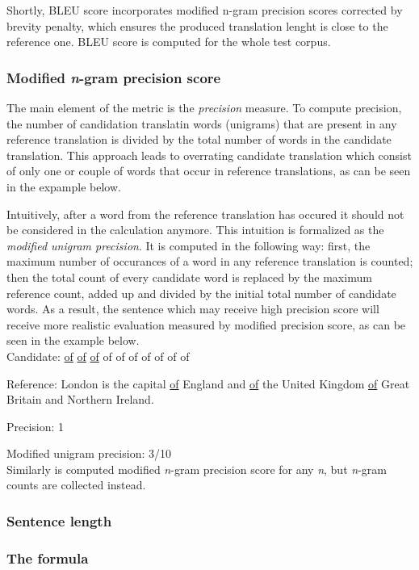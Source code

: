 Shortly, BLEU score incorporates modified n-gram precision scores corrected by brevity penalty,
which ensures the produced translation lenght is close to the reference one.
BLEU score is computed for the whole test corpus.

\subsubsection*{Modified \textit{n}-gram precision score}

The main element of the metric is the \textit{precision} measure.
To compute precision, the number of candidation translatin words (unigrams) that are present in
any reference translation is divided by the total number of words in the candidate translation.
This approach leads to overrating candidate translation which consist of only one or couple of
words that occur in reference translations, as can be seen in the expample below.

Intuitively, after a word from the reference translation has occured it should not be considered
in the calculation anymore. This intuition is formalized as the \textit{modified unigram precision}.
It is computed in the following way: first, the maximum number of occurances of a word in any
reference translation is counted; then the total count of every candidate word is replaced by the
maximum reference count, added up and divided by the initial total number of candidate words.
As a result, the sentence which may receive high precision score will receive more realistic evaluation
measured by modified precision score, as can be seen in the example below.\\

Candidate: \underline{of} \underline{of} \underline{of} of of of of of of of

Reference: London is the capital \underline{of} England and \underline{of} the United Kingdom
\underline{of} Great Britain and Northern Ireland.

Precision: 1

Modified unigram precision: 3/10
\\
Similarly is computed modified \textit{n}-gram precision score for any \textit{n}, but \textit{n}-gram
counts are collected instead.

\subsubsection*{Sentence length}

\subsubsection*{The formula}


